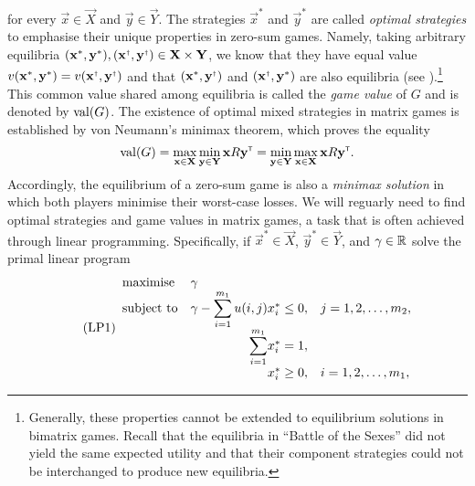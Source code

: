     for every $\vec{x} \in \vec{X}$ and $\vec{y} \in \vec{Y}$.
    The strategies $\vec{x}^*$ and $\vec{y}^*$ are called \emph{optimal strategies} to emphasise their unique properties in zero-sum games.
    Namely, taking arbitrary equilibria $(\vec{x}^*, \vec{y}^*), (\vec{x}^\sdagger, \vec{y}^\sdagger) \in \vec{X} \times \vec{Y}$, we know that they have equal value $v(\vec{x}^*, \vec{y}^*) = v(\vec{x}^\sdagger, \vec{y}^\sdagger)$ and that $(\vec{x}^*, \vec{y}^\sdagger)$ and $(\vec{x}^\sdagger, \vec{y}^*)$ are also equilibria (see \parencite[Theorem 2.1.2]{Owen2013}).\footnote{
        Generally, these properties cannot be extended to equilibrium solutions in bimatrix games.
        Recall that the equilibria in ``Battle of the Sexes'' did not yield the same expected utility and that their component strategies could not be interchanged to produce new equilibria.
    }
    This common value shared among equilibria is called the \emph{game value} of $G$ and is denoted by $\operatorname{val}(G)$.
    The existence of optimal mixed strategies in matrix games is established by von Neumann's \parencite{vonNeumann1959} minimax theorem, which proves the equality
    \begin{equation} \label{eq:minimax-equality}
        \operatorname{val}(G)
            = \max_{\mathbf{x} \in \mathbf{X}} \min_{\mathbf{y} \in \mathbf{Y}} \mathbf{x} R \mathbf{y}^{\scriptscriptstyle \mathsf{T}}
            = \min_{\mathbf{y} \in \mathbf{Y}} \max_{\mathbf{x} \in \mathbf{X}} \mathbf{x} R \mathbf{y}^{\scriptscriptstyle \mathsf{T}}.
    \end{equation}
    Accordingly, the equilibrium of a zero-sum game is also a \emph{minimax solution} in which both players minimise their worst-case losses.
    We will reguarly need to find optimal strategies and game values in matrix games, a task that is often achieved through linear programming.
    Specifically, if $\vec{x}^* \in \vec{X}$, $\vec{y}^* \in \vec{Y}$, and $\gamma \in \mathbb{R}$ solve the primal linear program
    \begin{equation} \label{lp:player1-program}
    \tag{LP1}
        \begin{array}{lr@{}ll}
            \text{maximise} & \multicolumn{1}{l}{\gamma} & & \\
            \text{subject to} & \gamma - \displaystyle\sum\limits_{i = 1}^{m_1} u(i, j) & x^*_i \le 0, &  j = 1, 2, \ldots, m_2, \\
             & \displaystyle\sum\limits_{i = 1}^{m_1} & x^*_i = 1, & \\
             & & x^*_i \ge 0, & i = 1, 2, \ldots, m_1, \\
        \end{array}
    \end{equation}

